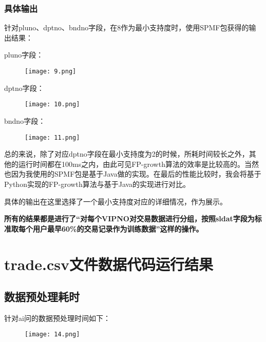 \documentclass{article}
\begin{document}
\begin{CJK}{UTF8}{gbsn}
\subsubsection{具体输出}
针对pluno、dptno、bndno字段，在8作为最小支持度时，使用SPMF包获得的输出结果：


pluno字段：
\begin{figure}[!h]
\begin{center}
  \texttt{[image: 9.png]}	
\end{center}
\end{figure}

dptno字段：
\begin{figure}[!h]
\begin{center}
  \texttt{[image: 10.png]}	
\end{center}
\end{figure}

bndno字段：
\begin{figure}[!h]
\begin{center}
  \texttt{[image: 11.png]}	
\end{center}
\end{figure}

总的来说，除了对应dptno字段在最小支持度为2的时候，所耗时间较长之外，其他的运行时间都在100ms之内，由此可见FP-growth算法的效率是比较高的。当然也因为我使用的SPMF包是基于Java做的实现。在最后的性能比较时，我会将基于Python实现的FP-growth算法与基于Java的实现进行对比。

具体的输出在这里选择了一个最小支持度对应的详细情况，作为展示。

\textbf{所有的结果都是进行了“对每个VIPNO对交易数据进行分组，按照sldat字段为标准取每个用户最早60\%的交易记录作为训练数据”这样的操作。}


\section{trade.csv文件数据代码运行结果}

\subsection{数据预处理耗时}

针对ai问的数据预处理时间如下：
\begin{figure}[!h]
\begin{center}
  \texttt{[image: 14.png]}	
\end{center}
\end{figure}


\end{CJK}
\end{document}
